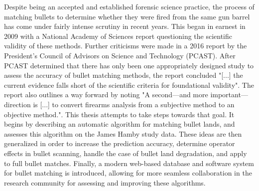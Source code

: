 
Despite being an accepted and established forensic science practice, the process of matching bullets to determine whether they were fired from the same gun barrel has come under fairly intense scrutiny in recent years. This began in earnest in 2009 with a National Academy of Sciences report questioning the scientific validity of these methods. Further criticisms were made in a 2016 report by the President's Council of Advisors on Science and Technology (PCAST). After PCAST determined that there has only been one appropriately designed study to assess the accuracy of bullet matching methods, the report concluded "[...] the current evidence falls short of the scientific criteria for foundational validity". The report also outlines a way forward by noting "A second—and more important—direction is [...] to convert firearms analysis from a subjective method to an objective method.". This thesis attempts to take steps towards that goal. It begins by describing an automatic algorithm for matching bullet lands, and assesses this algorithm on the James Hamby study data. These ideas are then generalized in order to increase the prediction accuracy, determine operator effects in bullet scanning, handle the case of bullet land degradation, and apply to full bullet matches. Finally, a modern web-based database and software system for bullet matching is introduced, allowing for more seamless collaboration in the research community for assessing and improving these algorithms.
